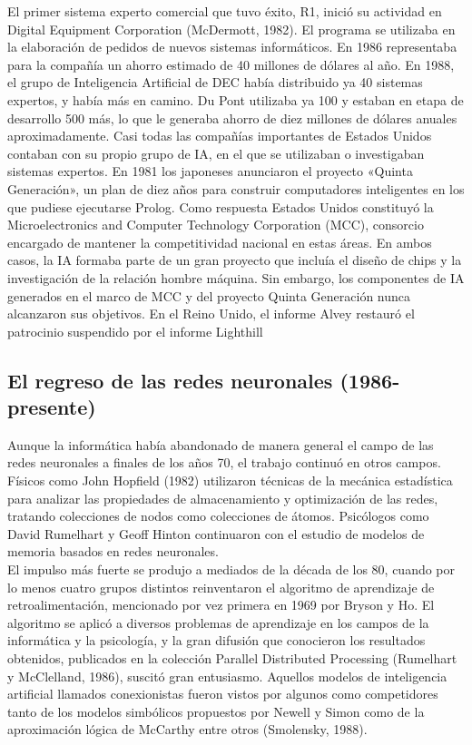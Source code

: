 \documentclass[12pt,a4paper]{report}
\begin{document}
El primer sistema experto comercial que tuvo éxito, R1, inició su actividad en Digital Equipment Corporation (McDermott, 1982). El programa se utilizaba en la elaboración de pedidos de nuevos sistemas informáticos. En 1986 representaba para la compañía un ahorro estimado de 40 millones de dólares al año. En 1988, el grupo de Inteligencia Artificial de DEC había distribuido ya 40 sistemas expertos, y había más en camino. Du Pont utilizaba ya 100 y estaban en etapa de desarrollo 500 más, lo que le generaba ahorro de diez millones de dólares anuales aproximadamente. Casi todas las compañías importantes de Estados Unidos contaban con su propio grupo de IA, en el que se utilizaban o investigaban sistemas expertos. En 1981 los japoneses anunciaron el proyecto «Quinta Generación», un plan de diez años para construir computadores inteligentes en los que pudiese ejecutarse Prolog. Como respuesta Estados Unidos constituyó la Microelectronics and Computer Technology Corporation (MCC), consorcio encargado de mantener la competitividad nacional en estas áreas. En ambos casos, la IA formaba parte de un gran proyecto que incluía el diseño de chips y la investigación de la relación hombre máquina. Sin embargo, los componentes de IA generados en el marco de MCC y del proyecto Quinta Generación nunca alcanzaron sus objetivos. En el Reino Unido, el informe Alvey restauró el patrocinio suspendido por el informe Lighthill

\subsection*{El regreso de las redes neuronales (1986-presente)}

Aunque la informática había abandonado de manera general el campo de las redes neuronales a finales de los años 70, el trabajo continuó en otros campos. Físicos como John Hopfield (1982) utilizaron técnicas de la mecánica estadística para analizar las propiedades de almacenamiento y optimización de las redes, tratando colecciones de nodos como colecciones de átomos. Psicólogos como David Rumelhart y Geoff Hinton continuaron con el estudio de modelos de memoria basados en redes neuronales.\\El impulso más fuerte se produjo a mediados de la década de los 80, cuando por lo menos cuatro grupos distintos reinventaron el algoritmo de aprendizaje de retroalimentación, mencionado por vez primera en 1969 por Bryson y Ho. El algoritmo se aplicó a diversos problemas de aprendizaje en los campos de la informática y la psicología, y la gran difusión que conocieron los resultados obtenidos, publicados en la colección Parallel Distributed Processing (Rumelhart y McClelland, 1986), suscitó gran entusiasmo. Aquellos modelos de inteligencia artificial llamados conexionistas fueron vistos por algunos como competidores tanto de los modelos simbólicos propuestos por Newell y Simon como de la aproximación lógica de McCarthy entre otros (Smolensky, 1988).
\end{document}
